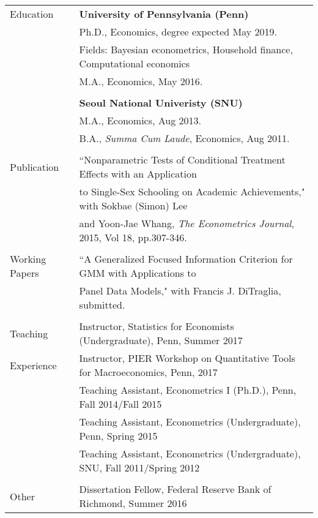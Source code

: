 \documentclass[letterpaper,11pt,oneside]{article}
\begin{document}
\noindent \begin{tabular}{@{} l l}
 \Large{Education} 
    & \textbf{University of Pennsylvania (Penn)} \\
     & Ph.D., Economics, degree expected May 2019. \\
     & Fields: Bayesian econometrics, Household finance, Computational economics \\
     & M.A., Economics, May 2016. \\
     & \\
     & \textbf{Seoul National Univeristy (SNU)} \\
          & M.A., Economics, Aug 2013. \\
     & B.A., \textit{Summa Cum Laude}, Economics, Aug 2011. \\
     \vspace{0.1in} \\
      \Large{Publication}    & ``Nonparametric Tests of Conditional Treatment Effects with an Application\\
 & to Single-Sex Schooling on Academic Achievements," with Sokbae (Simon) Lee\\
 & and Yoon-Jae Whang, \textit{The Econometrics Journal}, 2015, Vol 18, pp.307-346. \\
     \vspace{0.1in} \\
 \Large{Working Papers}    & ``A Generalized Focused Information Criterion for GMM with Applications to \\
 &Panel Data Models," with Francis J. DiTraglia, submitted. \\
     \vspace{0.1in} \\
  \Large{Teaching}    & Instructor, Statistics for Economists (Undergraduate), Penn, Summer 2017\\
  \Large{Experience} &  Instructor, PIER Workshop on Quantitative Tools for Macroeconomics, Penn, 2017\\%
      & Teaching Assistant, Econometrics I (Ph.D.), Penn, Fall 2014/Fall 2015 \\
     & Teaching Assistant, Econometrics (Undergraduate), Penn, Spring 2015\\
     & Teaching Assistant, Econometrics (Undergraduate), SNU, Fall 2011/Spring 2012\\
     \vspace{0.1in} \\
       \Large{Other}   & Dissertation Fellow, Federal Reserve Bank of Richmond, Summer 2016\\

\end{tabular}
\end{document}
